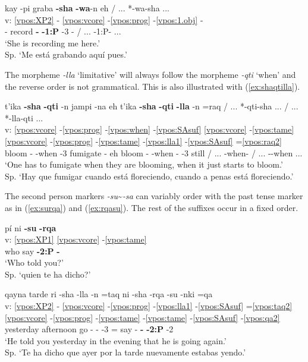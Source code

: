 \documentclass[output=paper]{langscibook}
\begin{document}
\ea \label{ex:shawa}{
    \glll{} kay -pi graba \textbf{-sha} \textbf{-wa}-n eh / ... *-wa-sha ... \\
    v: \ref{vpos:XP2} - \ref{vpos:vcore} -\ref{vpos:prog} -\ref{vpos:1.obj} - \\
    {} \Dem{} -\Loc{} record \textbf{-\Prog{}} \textbf{-1\Sg{}:P} -3\Sg{} - / ... -1\Sg{}:P-\Prog{} ...  \\
    \glt `She is recording me here.' \\ Sp. `Me está grabando aquí pues.' }
\z

 The morpheme \textit{-lla} `limitative' will always follow the morpheme \textit{-qti} `when' and the reverse order is not grammatical. This is also illustrated with (\ref{ex:shaqtilla}).

\ea \label{ex:shaqtilla}{
    \glll{} t'ika \textbf{-sha} \textbf{-qti} -n jampi -na eh t'ika \textbf{-sha} \textbf{-qti} \textbf{-lla} -n =raq / ... *-qti-sha ... / ... *-lla-qti ... \\
    v: \ref{vpos:vcore} -\ref{vpos:prog} -\ref{vpos:when} -\ref{vpos:SAsuf} \ref{vpos:vcore} -\ref{vpos:tame} \ref{vpos:vcore} -\ref{vpos:prog} -\ref{vpos:tame} -\ref{vpos:lla1} -\ref{vpos:SAsuf} =\ref{vpos:raq2} \\
    {} bloom -\Prog{} -when -3\Sg{} fumigate -\Oblig{} eh bloom -\Prog{} -when -\Limit{} -3\Sg{} still / ... -when-\Prog{} / ... -\Limit{}-when ... \\
    \glt `One has to fumigate when they are blooming, when it just starts to bloom.' \\ Sp. `Hay que fumigar cuando está floreciendo, cuando a penas está floreciendo.' }
\z 

The second person markers \textit{-su}\sim\textit{-sa} can variably order with the past tense marker as in (\ref{ex:surqa}) and (\ref{ex:rqasu}). The rest of the suffixes occur in a fixed order.

\ea \label{ex:surqa}{
    \glll {} pí ni \textbf{-su} \textbf{-rqa} \\
    v: \ref{vpos:XP1} \ref{vpos:vcore} -\ref{vpos:tame} \\
    {} who say \textbf{-2:P} \textbf{-\Pst{}} \\
    \glt `Who told you?' \\ Sp. `quien te ha dicho?' }
\z 

\ea \label{ex:rqasu}{
    \glll {} qayna tarde ri -sha -lla -n =taq  ni -sha -rqa -su -nki =qa \\
    v: \ref{vpos:XP2} - \ref{vpos:vcore} -\ref{vpos:prog} -\ref{vpos:lla1} -\ref{vpos:SAsuf} =\ref{vpos:taq2} \ref{vpos:vcore} -\ref{vpos:prog} -\ref{vpos:tame} -\ref{vpos:tame} -\ref{vpos:SAsuf} -\ref{vpos:qa2}  \\
    {} yesterday afternoon go -\Prog{} -\Limit{} -3 =\Conj{} say -\Prog{} \textbf{-\Pst{}} \textbf{-2:P} -2 \\
    \glt `He told you yesterday in the evening that he is going again.' \\ Sp. `Te ha dicho que ayer por la tarde nuevamente estabas yendo.' }
\z 
\end{document}
